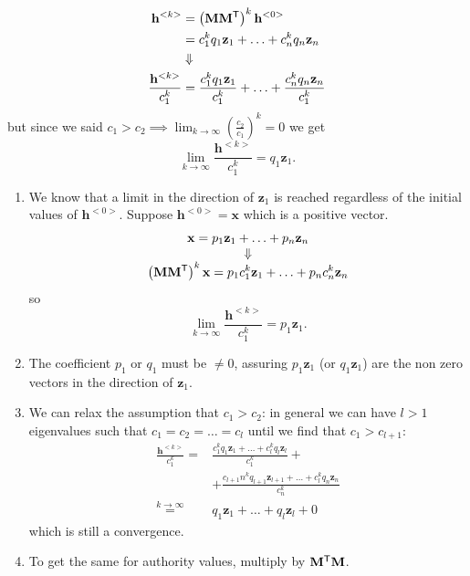\documentclass[a4paper,9pt]{extarticle}
\begin{document}
\begin{multicols*}{2}
		\begin{align*}
			\mathbf{h}^{<k>}&=\left(\mathbf{M}{\mathbf{M}}^{\mathsf{T}}\right)^{k}\mathbf{h}^{<0>}\\
			&=c^{k}_{1}q_{1}\mathbf{z}_{1}+\ldots+c^{k}_{n}q_{n}\mathbf{z}_{n}\\
			&\Downarrow\\
			\frac{	\mathbf{h}^{<k>}}{c_{1}^{k}}&=\frac{c^{k}_{1}q_{1}\mathbf{z}_{1}}{c_{1}^{k}}+\ldots+\frac{c^{k}_{n}q_{n}\mathbf{z}_{n}}{c^{k}_{1}}
		\end{align*} but since we said $c_{1}>c_{2}\implies\lim_{k\to\infty}\left(\frac{c_{2}}{c_{1}}\right)^{k}=0$ we get
		\begin{equation*}
			\lim_{k\to\infty}\frac{	\mathbf{h}^{<k>}}{c_{1}^{k}}=q_{1}\mathbf{z}_{1}.
		\end{equation*}
		\begin{riquadro}[Extension]
			\begin{enumerate}
				\item We know that a limit in the direction of $\mathbf{z}_{1}$ is reached regardless of the initial values of $\mathbf{h}^{<0>}$. Suppose $\mathbf{h}^{<0>}=\mathbf{x}$ which is a positive vector.
				\begin{equation*}
					\begin{array}{>{\displaystyle}c}
						\mathbf{x}=p_{1}\mathbf{z}_{1}+\ldots+p_{n}\mathbf{z}_{n}\\
						\Downarrow\\
						\left(\mathbf{M}\trans{\mathbf{M}}\right)^{k}\mathbf{x}=p_{1}c_{1}^{k}\mathbf{z}_{1}+\ldots+p_{n}c_{n}^{k}\mathbf{z}_{n}
					\end{array}
				\end{equation*}
				so
				\begin{equation*}
					\lim_{k\to\infty}\frac{	\mathbf{h}^{<k>}}{c_{1}^{k}}=p_{1}\mathbf{z}_{1}.
				\end{equation*}
				\item The coefficient $p_{1}$ or $q_{1}$ must be $\neq0$, assuring $p_{1}\mathbf{z}_{1}$ (or $q_{1}\mathbf{z}_{1}$) are the non zero vectors in the direction of $\mathbf{z}_{1}$.
				\item We can relax the assumption that $c_{1}>c_{2}$: in general we can have $l>1$ eigenvalues such that $c_{1}=c_{2}=\ldots=c_{l}$ until we find that $c_{1}>c_{l+1}$:
				\begin{align*}
					\frac{\mathbf{h}^{<k>}}{c_{1}^{k}}=&\frac{c^{k}_{1}q_{1}\mathbf{z}_{1}+\ldots+c^{k}_{l}q_{l}\mathbf{z}_{l}}{c^{k}_{1}}+\\
					&+\frac{c_{l+1}n^{k}q_{l+1}\mathbf{z}_{l+1}+\ldots+c^{k}_{l}q_{n}\mathbf{z}_{n}}{c^{k}_{n}}\\
					\overset{k\to\infty}{=}&q_{1}\mathbf{z}_{1}+\ldots+q_{l}\mathbf{z}_{l}+0
				\end{align*}
				which is still a convergence.
				\item To get the same for authority values, multiply by ${\mathbf{M}}^{\mathsf{T}}\mathbf{M}$.
			\end{enumerate}
		\end{riquadro}

\end{multicols*}
\end{document}
